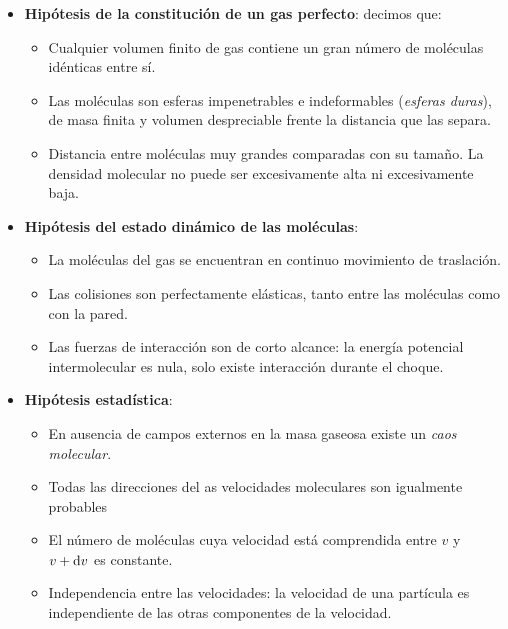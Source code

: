 \documentclass[12pt,a4paper,oneside]{book}
\begin{document}
\begin{itemize}
\item \textbf{Hipótesis de la constitución de un gas perfecto}: decimos que:

\begin{itemize}
\item Cualquier volumen finito de gas contiene un gran número de moléculas idénticas entre sí. 

\item Las moléculas son esferas impenetrables e indeformables (\textit{esferas duras}), de masa finita y volumen despreciable frente la distancia que las separa.

\item Distancia entre moléculas muy grandes comparadas con su tamaño. La densidad molecular no puede ser excesivamente alta ni excesivamente baja.
\end{itemize}

\item \textbf{Hipótesis del estado dinámico de las moléculas}:

\begin{itemize}
\item La moléculas del gas se encuentran en continuo movimiento de traslación.
\item Las colisiones son perfectamente elásticas, tanto entre las moléculas como con la pared.
\item Las fuerzas de interacción son de corto alcance: la energía potencial intermolecular es nula, solo existe interacción durante el choque. 
\end{itemize}

\item  \textbf{Hipótesis estadística}:

\begin{itemize}
\item En ausencia de campos externos en la masa gaseosa existe un \textit{caos molecular}. 
\item Todas las direcciones del as velocidades moleculares son igualmente probables
\item El número de moléculas cuya velocidad está comprendida entre $v$ y $v + \mathrm{d} v$ es constante.
\item Independencia entre las velocidades: la velocidad de una partícula es independiente de las otras componentes de la velocidad.
\end{itemize}

\end{itemize}
\end{document}
